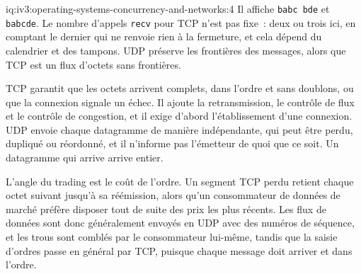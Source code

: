 \begin{solution}{iq:iv3:operating-systems-concurrency-and-networks:4}
Il affiche \texttt{b\textquotesingle{}abc\textquotesingle{} b\textquotesingle{}de\textquotesingle{}} et \texttt{b\textquotesingle{}abcde\textquotesingle{}}. Le nombre d'appels \texttt{recv} pour TCP n'est pas fixe~: deux ou trois ici, en comptant le dernier qui ne renvoie rien à la fermeture, et cela dépend du calendrier et des tampons. UDP préserve les frontières des messages, alors que TCP est un flux d'octets sans frontières.

TCP garantit que les octets arrivent complets, dans l'ordre et sans doublons, ou que la connexion signale un échec. Il ajoute la retransmission, le contrôle de flux et le contrôle de congestion, et il exige d'abord l'établissement d'une connexion. UDP envoie chaque datagramme de manière indépendante, qui peut être perdu, dupliqué ou réordonné, et il n'informe pas l'émetteur de quoi que ce soit. Un datagramme qui arrive arrive entier.

L'angle du trading est le coût de l'ordre. Un segment TCP perdu retient chaque octet suivant jusqu'à sa réémission, alors qu'un consommateur de données de marché préfère disposer tout de suite des prix les plus récents. Les flux de données sont donc généralement envoyés en UDP avec des numéros de séquence, et les trous sont comblés par le consommateur lui-même, tandis que la saisie d'ordres passe en général par TCP, puisque chaque message doit arriver et dans l'ordre.

\end{solution}


